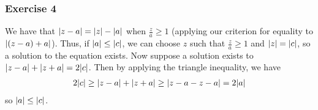 \subsubsection{Exercise 4}
We have that $\abs{z - a} = \abs{z} - \abs{a}$ when $\frac{z}{a} \geq 1$ (applying our criterion for equality
to $\abs{(z - a) + a}$). Thus, if $\abs{a} \leq \abs{c}$, we can choose $z$ such that $\frac{z}{a} \geq 1$ 
and $\abs{z} = \abs{c}$, so a solution to the equation exists. Now suppose a solution exists to 
 $\abs{z - a} + \abs{z + a} = 2\abs{c}$. Then by applying the triangle inequality, we have 
 \begin{align*}
         2\abs{c} \geq \abs{z - a} + \abs{z + a} \geq \abs{z - a - z - a} = 2\abs{a}
 \end{align*}
 so $\abs{a} \leq \abs{c}$.


